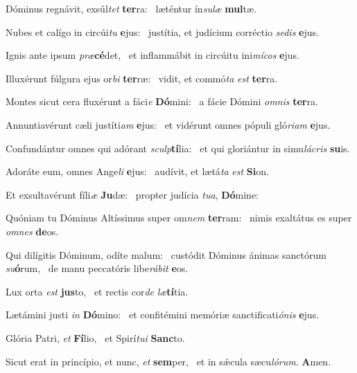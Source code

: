 \item Dóminus regnávit, exsúl\textit{tet} \textbf{ter}ra:~\psstar{} læténtur ín\textit{sulæ} \textbf{mul}tæ.
\item Nubes et calígo in circúi\textit{tu} \textbf{e}jus:~\psstar{} justítia, et judícium corréctio \textit{sedis} \textbf{e}jus.
\item Ignis ante ipsum \textit{præ}\textbf{cé}det,~\psstar{} et inflammábit in circúitu ini\textit{mícos} \textbf{e}jus.
\item Illuxérunt fúlgura ejus or\textit{bi} \textbf{ter}ræ:~\psstar{} vidit, et commó\textit{ta} \textit{est} \textbf{ter}ra.
\item Montes sicut cera fluxérunt a fáci\textit{e} \textbf{Dó}mini:~\psstar{} a fácie Dómini \textit{omnis} \textbf{ter}ra.
\item Annuntiavérunt cæli justíti\textit{am} \textbf{e}jus:~\psstar{} et vidérunt omnes pópuli gló\textit{riam} \textbf{e}jus.
\item Confundántur omnes qui adórant \textit{sculp}\textbf{tí}lia:~\psstar{} et qui gloriántur in simu\textit{lácris} \textbf{su}is.
\item Adoráte eum, omnes Ange\textit{li} \textbf{e}jus:~\psstar{} audívit, et lætá\textit{ta} \textit{est} \textbf{Si}on.
\item Et exsultavérunt fíli\textit{æ} \textbf{Ju}dæ:~\psstar{} propter judícia \textit{tua}, \textbf{Dó}mine:
\item Quóniam tu Dóminus Altíssimus super om\textit{nem} \textbf{ter}ram:~\psstar{} nimis exaltátus es super \textit{omnes} \textbf{de}os.
\item Qui dilígitis Dóminum, odíte malum:~\pscross{} custódit Dóminus ánimas sanctórum \textit{su}\textbf{ó}rum,~\psstar{} de manu peccatóris libe\textit{rábit} \textbf{e}os.
\item Lux orta \textit{est} \textbf{jus}to,~\psstar{} et rectis cor\textit{de} \textit{læ}\textbf{tí}tia.
\item Lætámini justi \textit{in} \textbf{Dó}mino:~\psstar{} et confitémini memóriæ sanctificati\textit{ónis} \textbf{e}jus.
\item Glória Patri, \textit{et} \textbf{Fí}lio,~\psstar{} et Spirí\textit{tui} \textbf{Sanc}to.
\item Sicut erat in princípio, et nunc, \textit{et} \textbf{sem}per,~\psstar{} et in sǽcula sæcu\textit{lórum}. \textbf{A}men.